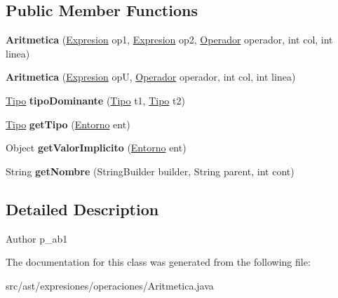 \subsection*{Public Member Functions}
\begin{DoxyCompactItemize}
\item 
\mbox{\label{classast_1_1expresiones_1_1operaciones_1_1_aritmetica_a63e08fd38ba32ac188b3587ed1c397ea}} 
{\bfseries Aritmetica} (\mbox{\hyperlink{interfaceast_1_1_expresion}{Expresion}} op1, \mbox{\hyperlink{interfaceast_1_1_expresion}{Expresion}} op2, \mbox{\hyperlink{enumast_1_1expresiones_1_1operaciones_1_1_operacion_1_1_operador}{Operador}} operador, int col, int linea)
\item 
\mbox{\label{classast_1_1expresiones_1_1operaciones_1_1_aritmetica_afb3cd0f634b1087642b9c83d42214249}} 
{\bfseries Aritmetica} (\mbox{\hyperlink{interfaceast_1_1_expresion}{Expresion}} opU, \mbox{\hyperlink{enumast_1_1expresiones_1_1operaciones_1_1_operacion_1_1_operador}{Operador}} operador, int col, int linea)
\item 
\mbox{\label{classast_1_1expresiones_1_1operaciones_1_1_aritmetica_a25b6fbd189ef258a170cbfd6acd58b21}} 
\mbox{\hyperlink{classentorno_1_1_tipo}{Tipo}} {\bfseries tipo\+Dominante} (\mbox{\hyperlink{classentorno_1_1_tipo}{Tipo}} t1, \mbox{\hyperlink{classentorno_1_1_tipo}{Tipo}} t2)
\item 
\mbox{\label{classast_1_1expresiones_1_1operaciones_1_1_aritmetica_a603e643081004e93fbbd85c4c6030564}} 
\mbox{\hyperlink{classentorno_1_1_tipo}{Tipo}} {\bfseries get\+Tipo} (\mbox{\hyperlink{classentorno_1_1_entorno}{Entorno}} ent)
\item 
\mbox{\label{classast_1_1expresiones_1_1operaciones_1_1_aritmetica_a4ff7d2a99104523f70679454c80449d0}} 
Object {\bfseries get\+Valor\+Implicito} (\mbox{\hyperlink{classentorno_1_1_entorno}{Entorno}} ent)
\item 
\mbox{\label{classast_1_1expresiones_1_1operaciones_1_1_aritmetica_a311c8c6028eb9c95cad1ea4363707547}} 
String {\bfseries get\+Nombre} (String\+Builder builder, String parent, int cont)
\end{DoxyCompactItemize}


\subsection{Detailed Description}
\begin{DoxyAuthor}{Author}
p\+\_\+ab1 
\end{DoxyAuthor}


The documentation for this class was generated from the following file\+:\begin{DoxyCompactItemize}
\item 
src/ast/expresiones/operaciones/Aritmetica.\+java\end{DoxyCompactItemize}
